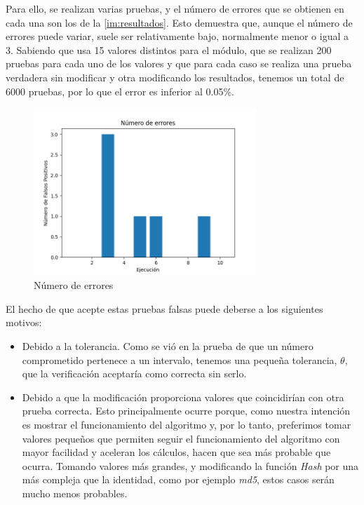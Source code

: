 Para ello, se realizan varias pruebas, y el número de errores que se obtienen en cada una son los de la \autoref{im:resultados}. Esto demuestra que, aunque el número de errores puede variar, suele ser relativamente bajo, normalmente menor o igual a 3. Sabiendo que usa 15 valores distintos para el módulo, que se realizan 200 pruebas para cada uno de los valores y que para cada caso se realiza una prueba verdadera sin modificar y otra modificando los resultados, tenemos un total de 6000 pruebas, por lo que el error es inferior al 0.05\%.

\begin{figure}[H]
    \centering
    \includegraphics[width=0.75\textwidth]{images/anexoA/resultados.png}
    \caption{Número de errores}
    \label{im:resultados}
\end{figure}

El hecho de que acepte estas pruebas falsas puede deberse a los siguientes motivos:
\begin{itemize}
    \item Debido a la tolerancia. Como se vió en la prueba de que un número comprometido pertenece a un intervalo, tenemos una pequeña tolerancia, $\theta$, que la verificación aceptaría como correcta sin serlo.

    \item Debido a que la modificación proporciona valores que coincidirían con otra prueba correcta. Esto principalmente ocurre porque, como nuestra intención es mostrar el funcionamiento del algoritmo y, por lo tanto, preferimos tomar valores pequeños que permiten seguir el funcionamiento del algoritmo con mayor facilidad y aceleran los cálculos, hacen que sea más probable que ocurra. Tomando valores más grandes, y modificando la función \emph{Hash} por una más compleja que la identidad, como por ejemplo \emph{md5}, estos casos serán mucho menos probables.
\end{itemize}


